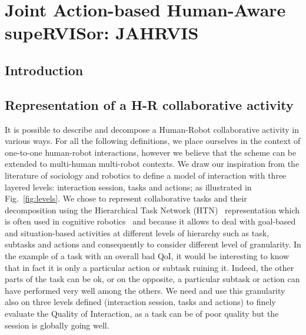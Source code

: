 \documentclass[a4paper,11pt,twoside]{StyleThese}
\begin{document}
\setcounter{chapter}{1} %
\dominitoc
\faketableofcontents
\fi

\chapter{Joint Action-based Human-Aware supeRVISor: JAHRVIS}
\label{chapter:chap2}
\minitoc

\section{Introduction}

\section{Representation of a H-R collaborative activity}\label{sec:levels}
It is possible to describe and decompose a Human-Robot collaborative activity in various ways. For all the following definitions, we place ourselves in the context of one-to-one human-robot interactions, however we  believe that the scheme can be extended to multi-human multi-robot contexts. 
We draw our inspiration from the literature of sociology and robotics to define a model of interaction with three layered levels: interaction session, tasks and actions; as illustrated in Fig.~\ref{fig:levels}. We chose to represent collaborative tasks and their decomposition using the Hierarchical Task Network (HTN)~\cite{ghallab_2016_automated} representation which is often used in cognitive robotics~\cite{ingrand-2017,lallement_2014_hatp} and because it allows to deal with goal-based and situation-based activities at different levels of hierarchy such as task, subtasks and actions and consequently to consider different level of granularity. In the example of a task with an overall bad QoI, it would be interesting to know that in fact it is only a particular action or subtask ruining it. Indeed, the other parts of the task can be ok, or on the opposite, a particular subtask or action can have performed very well among the others. We need and use this granularity also on three levels defined (interaction session, tasks and actions) to finely evaluate the Quality of Interaction, as a task can be of poor quality but the session is globally going well. 
\end{document}
